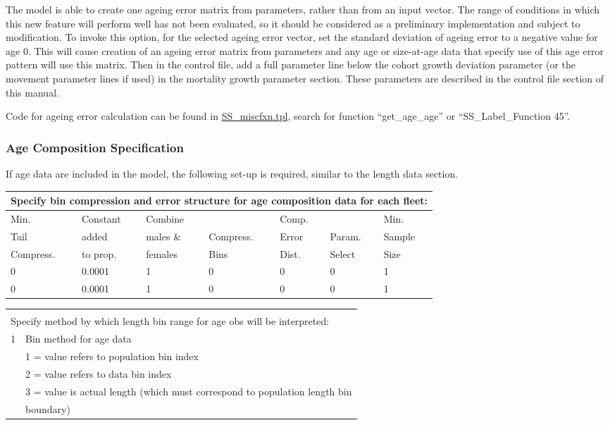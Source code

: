 The model is able to create one ageing error matrix from parameters, rather than from an input vector.  The range of conditions in which this new feature will perform well has not been evaluated, so it should be considered as a preliminary implementation and subject to modification. To invoke this option, for the selected ageing error vector, set the standard deviation of ageing error to a negative value for age 0.  This will cause creation of an ageing error matrix from parameters and any age or size-at-age data that specify use of this age error pattern will use this matrix. Then in the control file, add a full parameter line below the cohort growth deviation parameter (or the movement parameter lines if used) in the mortality growth parameter section.  These parameters are described in the control file section of this manual.

Code for ageing error calculation can be found in \href{https://github.com/nmfs-stock-synthesis/stock-synthesis/blob/main/SS_miscfxn.tpl}{SS\_miscfxn.tpl}, search for function ``get\_age\_age'' or ``SS\_Label\_Function 45''.

\subsubsection{Age Composition Specification}
If age data are included in the model, the following set-up is required, similar to the length data section.

\begin{tabular}{p{2cm} p{2cm} p{2cm} p{1.5cm} p{1.5cm} p{2cm} p{2cm}}
		\multicolumn{7}{l}{Specify bin compression and error structure for age composition data for each fleet:}\\
		\hline
		Min.      & Constant & Combine   &           & Comp. &           & Min.\Tstrut\\
		Tail      & added    & males \&  & Compress. & Error & Param.    & Sample\\
		Compress. & to prop. & females   & Bins      & Dist. & Select    & Size\Bstrut\\
		\hline
		0 & 0.0001 & 1 & 0 & 0 & 0 & 1 \Tstrut\\
		0 & 0.0001 & 1 & 0 & 0 & 0 & 1 \Bstrut\\
		\hline
\end{tabular}

			
\begin{tabular}{p{1cm} p{14cm}}
	 & \\
	\multicolumn{2}{l}{Specify method by which length bin range for age obs will be interpreted:}\\
	\hline
	1 & Bin method for age data \Tstrut\\
	  & 1 = value refers to population bin index\\
	  & 2 = value refers to data bin index\\
	  & 3 = value is actual length (which must correspond to population length bin  \\
	  & boundary)\Bstrut\\
	 \hline
\end{tabular}


